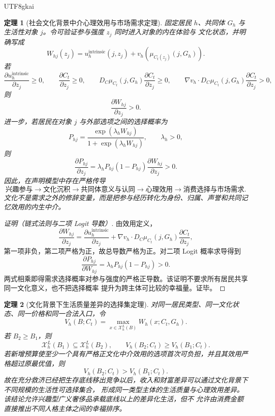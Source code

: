 \documentclass[12pt,a4paper,openany]{report}
\newtheorem{theorem}{定理}[chapter]
\begin{document}
\begin{CJK*}{UTF8}{gkai}
\begin{theorem}[社会文化背景中介心理效用与市场需求定理]
\label{thm:culture-mediated-utility-demand}
固定居民 \(h\)、共同体 \(G_h\) 与生活性对象 \(j\)。令可验证参与强度 \(z_j\) 同时进入对象的内在体验与
文化状态，并明确写成
\[
  W_{hj}(z_j)
  =u_h^{\mathrm{intrinsic}}(j,z_j)
  +v_h\!\left(\mu_{C_t(z_j)}(j,G_h)\right).
\]
若
\[
  \frac{\partial u_h^{\mathrm{intrinsic}}}{\partial z_j}\ge0,
  \qquad
  \frac{\partial C_t}{\partial z_j}\ge0,\qquad
  D_C\mu_{C_t}(j,G_h)\frac{\partial C_t}{\partial z_j}\ge0,
  \qquad
  \nabla v_h\cdot
  D_C\mu_{C_t}(j,G_h)\frac{\partial C_t}{\partial z_j}>0,
\]
则
\[
  \frac{\partial W_{hj}}{\partial z_j}>0.
\]
进一步，若居民在对象 \(j\) 与外部选项之间的选择概率为
\[
  P_{hj}
  =
  \frac{\exp(\lambda_hW_{hj})}
  {1+\exp(\lambda_hW_{hj})},
  \qquad\lambda_h>0,
\]
则
\[
  \frac{\partial P_{hj}}{\partial z_j}
  =
  \lambda_hP_{hj}(1-P_{hj})
  \frac{\partial W_{hj}}{\partial z_j}>0.
\]
因此，在声明模型中存在严格传导
\[
  \text{兴趣参与}
  \longrightarrow
  \text{文化沉积}
  \longrightarrow
  \text{共同体意义与认同}
  \longrightarrow
  \text{心理效用}
  \longrightarrow
  \text{消费选择与市场需求}.
\]
文化不是需求之外的修辞变量，而是把参与经历转化为身份、归属、声誉和共同记忆效用的内生中介。
\end{theorem}

\begin{proof}[证明（链式法则与二项 Logit 导数）]
由效用定义，
\[
  \frac{\partial W_{hj}}{\partial z_j}
  =
  \frac{\partial u_h^{\mathrm{intrinsic}}}{\partial z_j}
  +
  \nabla v_h\cdot
  D_C\mu_{C_t}(j,G_h)
  \frac{\partial C_t}{\partial z_j},
\]
第一项非负，第二项严格为正，故总导数严格为正。对二项 Logit 概率求导得到
\[
  \frac{\partial P_{hj}}{\partial W_{hj}}
  =\lambda_hP_{hj}(1-P_{hj})>0.
\]
两式相乘即得需求选择概率对参与强度的严格正导数。该证明不要求所有居民共享同一文化意义，也不把选择概率
提升为跨主体可比较的幸福量。证毕。
\end{proof}

\begin{theorem}[文化背景下生活质量差异的选择集定理]
\label{thm:culture-life-quality-choice-set}
对同一居民类型、同一文化状态、同一价格和同一合法入口，令
\[
  V_h(B;C_t)
  =
  \max_{x\in\mathcal X_h^L(B)}W_h(x;C_t,G_h).
\]
若 \(B_2\ge B_1\)，则
\[
  \mathcal X_h^L(B_1)\subseteq\mathcal X_h^L(B_2),
  \qquad
  V_h(B_2;C_t)\ge V_h(B_1;C_t).
\]
若新增预算使至少一个具有严格正文化中介效用的选项首次可负担，并且其效用严格超过原最优值，则
\[
  V_h(B_2;C_t)>V_h(B_1;C_t).
\]
故在充分救济已经把生存底线移出竞争以后，收入和财富差异可以通过文化背景下不同规模的生活性可选择集合，
形成同一类型主体的生活质量与心理效用差异。该结论允许兴趣型广义奢侈品承载底线以上的差异化生活，但不
允许由消费金额直接推出不同人格主体之间的幸福排序。
\end{theorem}


\end{CJK*}
\end{document}
